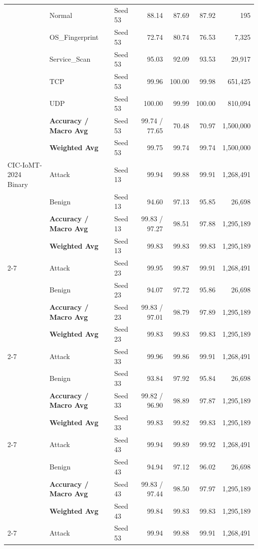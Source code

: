 \documentclass[a4paper,fleqn]{cas-sc}
\begin{document}
{\begin{landscape}
\begin{longtable}{lllrrrr}
 & Normal & Seed 53 & 88.14 & 87.69 & 87.92 & 195 \\
 & OS\_Fingerprint & Seed 53 & 72.74 & 80.74 & 76.53 & 7,325 \\
 & Service\_Scan & Seed 53 & 95.03 & 92.09 & 93.53 & 29,917 \\
 & TCP & Seed 53 & 99.96 & 100.00 & 99.98 & 651,425 \\
 & UDP & Seed 53 & 100.00 & 99.99 & 100.00 & 810,094 \\
 & \textbf{Accuracy / Macro Avg} & Seed 53 & 99.74 / 77.65 & 70.48 & 70.97 & 1,500,000 \\
 & \textbf{Weighted Avg} & Seed 53 & 99.75 & 99.74 & 99.74 & 1,500,000 \\
\midrule
CIC-IoMT-2024 Binary & Attack & Seed 13 & 99.94 & 99.88 & 99.91 & 1,268,491 \\
 & Benign & Seed 13 & 94.60 & 97.13 & 95.85 & 26,698 \\
 & \textbf{Accuracy / Macro Avg} & Seed 13 & 99.83 / 97.27 & 98.51 & 97.88 & 1,295,189 \\
 & \textbf{Weighted Avg} & Seed 13 & 99.83 & 99.83 & 99.83 & 1,295,189 \\
\cline{2-7}
 & Attack & Seed 23 & 99.95 & 99.87 & 99.91 & 1,268,491 \\
 & Benign & Seed 23 & 94.07 & 97.72 & 95.86 & 26,698 \\
 & \textbf{Accuracy / Macro Avg} & Seed 23 & 99.83 / 97.01 & 98.79 & 97.89 & 1,295,189 \\
 & \textbf{Weighted Avg} & Seed 23 & 99.83 & 99.83 & 99.83 & 1,295,189 \\
\cline{2-7}
 & Attack & Seed 33 & 99.96 & 99.86 & 99.91 & 1,268,491 \\
 & Benign & Seed 33 & 93.84 & 97.92 & 95.84 & 26,698 \\
 & \textbf{Accuracy / Macro Avg} & Seed 33 & 99.82 / 96.90 & 98.89 & 97.87 & 1,295,189 \\
 & \textbf{Weighted Avg} & Seed 33 & 99.83 & 99.82 & 99.83 & 1,295,189 \\
\cline{2-7}
 & Attack & Seed 43 & 99.94 & 99.89 & 99.92 & 1,268,491 \\
 & Benign & Seed 43 & 94.94 & 97.12 & 96.02 & 26,698 \\
 & \textbf{Accuracy / Macro Avg} & Seed 43 & 99.83 / 97.44 & 98.50 & 97.97 & 1,295,189 \\
 & \textbf{Weighted Avg} & Seed 43 & 99.84 & 99.83 & 99.83 & 1,295,189 \\
\cline{2-7}
 & Attack & Seed 53 & 99.94 & 99.88 & 99.91 & 1,268,491 \\

\end{longtable}
\end{landscape}}
\end{document}
